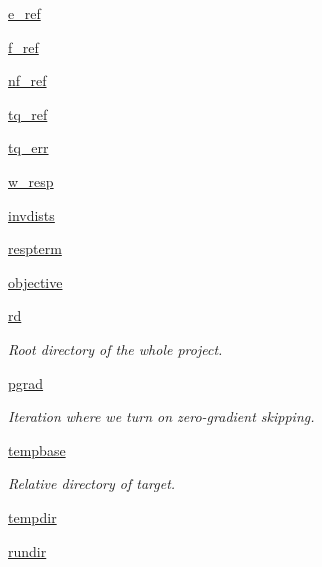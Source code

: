 \begin{DoxyCompactItemize}
\hyperlink{classforcebalance_1_1abinitio_1_1AbInitio_a71d13d3fabd98146c68bb5fc784f6732}{e\-\_\-ref}
\item 
\hyperlink{classforcebalance_1_1abinitio_1_1AbInitio_a6631ee11ee5646d97ea0fa5c9b22fc6a}{f\-\_\-ref}
\item 
\hyperlink{classforcebalance_1_1abinitio_1_1AbInitio_a5a77f4b99a5b01245ab0435d632122a1}{nf\-\_\-ref}
\item 
\hyperlink{classforcebalance_1_1abinitio_1_1AbInitio_aadda7244869b583a4533317615c421e1}{tq\-\_\-ref}
\item 
\hyperlink{classforcebalance_1_1abinitio_1_1AbInitio_ae60e834d5b5bf13f8fb70d403a97db28}{tq\-\_\-err}
\item 
\hyperlink{classforcebalance_1_1abinitio_1_1AbInitio_a176a442bd340d2f9b54319e76feb46ae}{w\-\_\-resp}
\item 
\hyperlink{classforcebalance_1_1abinitio_1_1AbInitio_aa01ee600ba0f429ffc81135af9d8109b}{invdists}
\item 
\hyperlink{classforcebalance_1_1abinitio_1_1AbInitio_a689e3849518b33539442a473a41ed32d}{respterm}
\item 
\hyperlink{classforcebalance_1_1abinitio_1_1AbInitio_acbbd447b9f66bc4699992f3b64bb256d}{objective}
\item 
\hyperlink{classforcebalance_1_1target_1_1Target_a4edb69fbde792e9f2f27e54b7c978c8e}{rd}
\begin{DoxyCompactList}\small\item\em Root directory of the whole project. \end{DoxyCompactList}\item 
\hyperlink{classforcebalance_1_1target_1_1Target_a684235b4332b608c4e2da22982c2fdfa}{pgrad}
\begin{DoxyCompactList}\small\item\em Iteration where we turn on zero-\/gradient skipping. \end{DoxyCompactList}\item 
\hyperlink{classforcebalance_1_1target_1_1Target_ae5b544d3e11365865813ef3d626ef81d}{tempbase}
\begin{DoxyCompactList}\small\item\em Relative directory of target. \end{DoxyCompactList}\item 
\hyperlink{classforcebalance_1_1target_1_1Target_aa1f01b5b78db253b5b66384ed11ed193}{tempdir}
\item 
\hyperlink{classforcebalance_1_1target_1_1Target_a6872de5b2d4273b82336ea5b0da29c9e}{rundir}

\end{DoxyCompactItemize}
